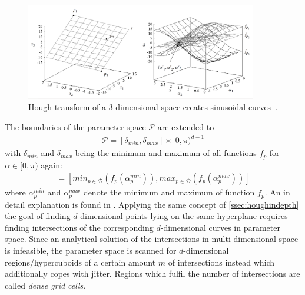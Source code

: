 \begin{figure}
    \centering
    \includegraphics[width=0.9\textwidth]{figures/cash3d.png}
    \caption{Hough transform of a 3-dimensional space creates sinusoidal curves~\cite{opticsankerst1999optics}.}
    \label{fig:cash3d}
\end{figure}

The boundaries of the parameter space $\mathcal{P}$ are extended to \begin{align}
    \mathcal{P} = [\delta_{min}, \delta_{max}]\times [0,\pi)^{d-1}
\end{align} with $\delta_{min}$ and $\delta_{max}$ being the minimum and maximum of all functions $f_p$ for $\alpha \in [0,\pi)$ again: 
\begin{align}
    [\delta_{min}, \delta_{max}] = [min_{p \in \mathcal{D}}(f_p(\alpha_p^{min})), max_{p \in \mathcal{D}}(f_p(\alpha_p^{max}))]
\end{align} 
where $\alpha_p^{min}$ and $\alpha_p^{max}$ denote the minimum and maximum of function $f_p$. An in detail explanation is found in \textcite{CASHachtert2008robust}.
Applying the same concept of \autoref{ssec:houghindepth} the goal of finding $d$-dimensional points lying on the same hyperplane requires finding intersections of the corresponding $d$-dimensional curves in parameter space. Since an analytical solution of the intersections in multi-dimensional space is infeasible, the parameter space is scanned for $d$-dimensional regions/hypercuboids of a certain amount $m$ of intersections instead which additionally copes with jitter. Regions which fulfil the number of intersections are called \textit{dense grid cells}.

